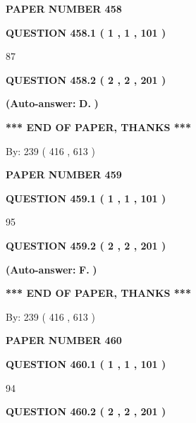\documentclass[12pt]{article}
\begin{document}
   
\newpage 
\setcounter{page}{ 
   458001 } 
   
   
 {\textbf{ \Large{ PAPER NUMBER  458  }}}
   
   
   
   
  
  
{\textbf{\large{QUESTION
458.1 
 ( 1 , 1 , 101 )
}}}

87
  
  
{\textbf{\large{QUESTION
458.2 
 ( 2 , 2 , 201 )
}}}
 
 
{\textbf{(Auto-answer:}}
{\textbf{\large{
D.}}}
{\textbf{)}}
 
 
   
   
   
   
\vspace{1.0in} 
{\textbf{\large{ *** END OF PAPER, THANKS *** }}} 
   
   
\hspace{1.0in} By: 
 239 ( 416 ,  613 )
   
   
   
   
\newpage 
\setcounter{page}{ 
   459001 } 
   
   
 {\textbf{ \Large{ PAPER NUMBER  459  }}}
   
   
   
   
  
  
{\textbf{\large{QUESTION
459.1 
 ( 1 , 1 , 101 )
}}}

95
  
  
{\textbf{\large{QUESTION
459.2 
 ( 2 , 2 , 201 )
}}}
 
 
{\textbf{(Auto-answer:}}
{\textbf{\large{
F.}}}
{\textbf{)}}
 
 
   
   
   
   
\vspace{1.0in} 
{\textbf{\large{ *** END OF PAPER, THANKS *** }}} 
   
   
\hspace{1.0in} By: 
 239 ( 416 ,  613 )
   
   
   
   
\newpage 
\setcounter{page}{ 
   460001 } 
   
   
 {\textbf{ \Large{ PAPER NUMBER  460  }}}
   
   
   
   
  
  
{\textbf{\large{QUESTION
460.1 
 ( 1 , 1 , 101 )
}}}

94
  
  
{\textbf{\large{QUESTION
460.2 
 ( 2 , 2 , 201 )
}}}
 
\end{document}
